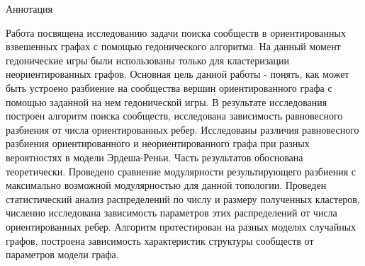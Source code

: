 \begin{center}
	\large 	Аннотация
\end{center}

Работа посвящена исследованию задачи поиска сообществ в ориентированных взвешенных графах с помощью гедонического алгоритма. На данный момент гедонические игры были использованы только для кластеризации неориентированных графов. Основная цель данной работы - понять, как может быть устроено разбиение на сообщества вершин ориентированного графа с помощью заданной на нем гедонической игры. В результате исследования построен алгоритм поиска сообществ, исследована зависимость равновесного разбиения от числа ориентированных ребер. Исследованы различия равновесного разбиения ориентированного и неориентированного графа при разных вероятностях в модели Эрдеша-Реньи. Часть результатов обоснована теоретически. Проведено сравнение модулярности результирующего разбиения с максимально возможной модулярностью для данной топологии. Проведен статистический анализ распределений по числу и размеру полученных кластеров, численно исследована зависимость параметров этих распределений от числа ориентированных ребер. Алгоритм протестирован на разных моделях случайных графов, построена зависимость характеристик структуры сообществ от параметров модели графа.